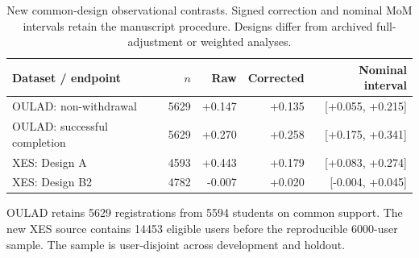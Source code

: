 \begin{table}[htbp]\centering\small
\caption{New common-design observational contrasts. Signed correction and nominal MoM intervals retain the manuscript procedure. Designs differ from archived full-adjustment or weighted analyses.}\label{tab:real-results}
\begin{tabularx}{\textwidth}{Xrrrr}\toprule
Dataset / endpoint & $n$ & Raw & Corrected & Nominal interval \\\midrule
OULAD: non-withdrawal & 5629 & +0.147 & +0.135 & [+0.055, +0.215] \\
OULAD: successful completion & 5629 & +0.270 & +0.258 & [+0.175, +0.341] \\
XES: Design A & 4593 & +0.443 & +0.179 & [+0.083, +0.274] \\
XES: Design B2 & 4782 & -0.007 & +0.020 & [-0.004, +0.045] \\
\bottomrule\end{tabularx}\end{table}
OULAD retains 5629 registrations from 5594 students on common support. The new XES source contains 14453 eligible users before the reproducible 6000-user sample. The sample is user-disjoint across development and holdout.